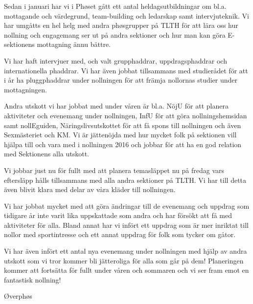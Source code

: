 \documentclass[../_main/handlingar.tex]{subfiles}
\begin{document}

Sedan i januari har vi i Phøset gått ett antal heldagsutbildningar om bl.a. mottagande och värdegrund, team-building och ledarskap samt intervjuteknik. Vi har umgåtts en hel helg med andra phøsgrupper på TLTH för att lära oss hur nollning och engagemang ser ut på andra sektioner och hur man kan göra E-sektionens mottagning ännu bättre.

Vi har haft intervjuer med, och valt grupphaddrar, uppdragsphaddrar och internationella phaddrar. Vi har även jobbat tillsammans med studierådet för att i år ha pluggphaddrar under nollningen för att främja nollornas studier under mottagningen.

Andra utskott vi har jobbat med under våren är bl.a. NöjU för att planera aktiviteter och evenemang under nollningen, InfU för att göra nollningshemsidan samt nollEguiden, Näringslivsutskottet för att få spons till nollningen och även Sexmästeriet och KM. Vi är jättenöjda med hur mycket folk på sektionen vill hjälpa till och vara med i nollningen 2016 och jobbar för att ha en god relation med Sektionens alla utskott.

Vi jobbar just nu för fullt med att planera temasläppet nu på fredag vars eftersläpp hålls tillsammans med alla andra sektioner på TLTH. Vi har till detta även blivit klara med delar av våra kläder till nollningen.

Vi har jobbat mycket med att göra ändringar till de evenemang och uppdrag som tidigare år inte varit lika uppskattade som andra och har försökt att få med aktiviteter för alla. Bland annat har vi infört ett uppdrag som är mer inriktat till nollor med sportintresse och ett annat uppdrag för folk som tycker om gåtor.

Vi har även infört ett antal nya evenemang under nollningen med hjälp av andra utskott som vi tror kommer bli jätteroliga för alla som går på dem! Planeringen kommer att fortsätta för fullt under våren och sommaren och vi ser fram emot en fantastisk nollning!

\begin{signatures}{1}
    \mvh
    \signature{Molly Rusk}{Øverphøs}
\end{signatures}
\end{document}
